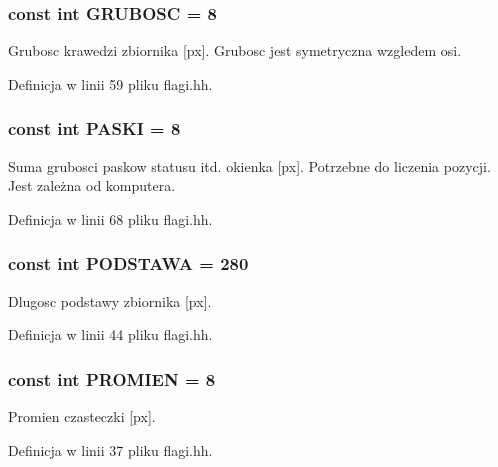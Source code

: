 \subsubsection[{G\+R\+U\+B\+O\+S\+C}]{\setlength{\rightskip}{0pt plus 5cm}const int G\+R\+U\+B\+O\+S\+C = 8}\label{flagi_8hh_a359a95636f17b8e9b7a01389d75b521d}
Grubosc krawedzi zbiornika \mbox{[}px\mbox{]}. Grubosc jest symetryczna wzgledem osi. 

Definicja w linii 59 pliku flagi.\+hh.

\hypertarget{flagi_8hh_afa380d01dc08ee237b4eea9046704397}{}
\subsubsection[{P\+A\+S\+K\+I}]{\setlength{\rightskip}{0pt plus 5cm}const int P\+A\+S\+K\+I = 8}\label{flagi_8hh_afa380d01dc08ee237b4eea9046704397}
Suma grubosci paskow statusu itd. okienka \mbox{[}px\mbox{]}. Potrzebne do liczenia pozycji. Jest zależna od komputera. 

Definicja w linii 68 pliku flagi.\+hh.

\hypertarget{flagi_8hh_acd3c5814c051e565bf7854f6403acf49}{}
\subsubsection[{P\+O\+D\+S\+T\+A\+W\+A}]{\setlength{\rightskip}{0pt plus 5cm}const int P\+O\+D\+S\+T\+A\+W\+A = 280}\label{flagi_8hh_acd3c5814c051e565bf7854f6403acf49}
Dlugosc podstawy zbiornika \mbox{[}px\mbox{]}. 

Definicja w linii 44 pliku flagi.\+hh.

\hypertarget{flagi_8hh_aa77f856f3142a9e81752665a9bc2e6de}{}
\subsubsection[{P\+R\+O\+M\+I\+E\+N}]{\setlength{\rightskip}{0pt plus 5cm}const int P\+R\+O\+M\+I\+E\+N = 8}\label{flagi_8hh_aa77f856f3142a9e81752665a9bc2e6de}
Promien czasteczki \mbox{[}px\mbox{]}. 

Definicja w linii 37 pliku flagi.\+hh.

